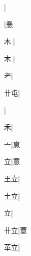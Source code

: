 \begin{multicols}{2}
{{\cjk{}{\cnsym{}　}{\cnsym{}　}{\cnsym{}　}}|{}\par
{}|{\cjk{}惷}\par
{\cjk{}{\cnsym{}　}木{\cnxJzr{}}}|{}\par
{\cjk{}{\cnsym{}　}木{\cnxJzr{}}}|{}\par
{\cjk{}{\cnsym{}　}{\cnsym{}　}耂}|{}\par
{\cjk{}{\cnsym{}　}卄屯}|{}\par
{}|{}\par
{禾}|{}\par
{\cjk{}{\cnsym{}　}{\cnsym{}　}亠}|{\cjk{}恴}\par
{\cjk{}{\cnsym{}　}{\cnsym{}　}立}|{\cjk{}意}\par
{\cjk{}{\cnsym{}　}王立}|{}\par
{\cjk{}{\cnsym{}　}土立}|{}\par
{立}|{}\par
{\cjk{}{\cnsym{}　}卄立}|{\cjk{}薏}\par
{\cjk{}{\cnsym{}　}革立}|{}\par
}
\end{multicols}
